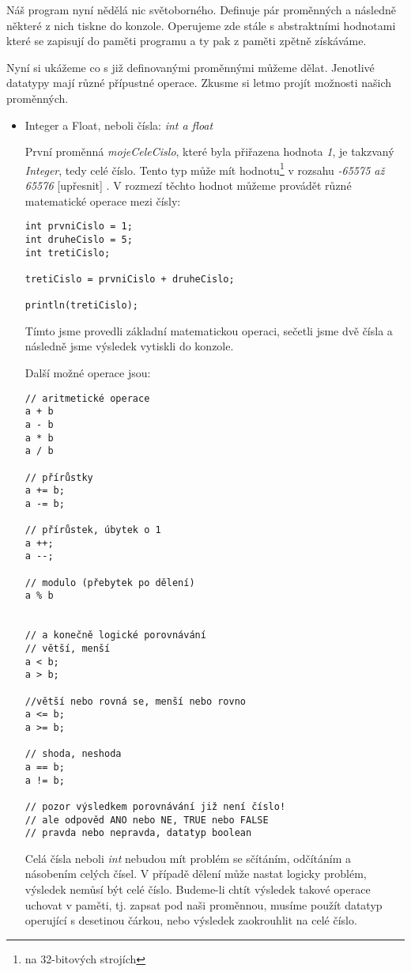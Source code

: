 \documentclass[11pt]{article} %
\begin{document}
Náš program nyní nědělá nic světoborného. Definuje pár proměnných a následně některé z nich tiskne do konzole. Operujeme zde stále s abstraktními hodnotami které se zapisují do paměti programu a ty pak z paměti zpětně získáváme.

Nyní si ukážeme co s již definovanými proměnnými můžeme dělat. Jenotlivé datatypy mají různé přípustné operace. Zkusme si letmo projít možnosti našich proměnných.

\begin{itemize}


\item{Integer a Float, neboli čísla: {\em int a float}}

První proměnná {\em mojeCeleCislo}, které byla přiřazena hodnota {\em 1}, je takzvaný {\em Integer}, tedy celé číslo. Tento typ může mít hodnotu\footnote{na 32-bitových strojích} v rozsahu {\em -65575 až 65576} [upřesnit] . V rozmezí těchto hodnot můžeme provádět různé matematické operace mezi čísly:

\begin{verbatim}
int prvniCislo = 1;
int druheCislo = 5;
int tretiCislo;

tretiCislo = prvniCislo + druheCislo;

println(tretiCislo);
\end{verbatim}

Tímto jsme provedli základní matematickou operaci, sečetli jsme dvě čísla a následně jsme výsledek vytiskli do konzole.

Další možné operace jsou:

\begin{verbatim}
// aritmetické operace
a + b
a - b
a * b
a / b

// přírůstky
a += b;
a -= b;

// přírůstek, úbytek o 1
a ++;
a --;

// modulo (přebytek po dělení)
a % b


// a konečně logické porovnávání
// větší, menší
a < b;
a > b;

//větší nebo rovná se, menší nebo rovno
a <= b;
a >= b;

// shoda, neshoda
a == b;
a != b;

// pozor výsledkem porovnávání již není číslo!
// ale odpověd ANO nebo NE, TRUE nebo FALSE
// pravda nebo nepravda, datatyp boolean

\end{verbatim}

Celá čísla neboli {\em int} nebudou mít problém se sčítáním, odčítáním a násobením celých čísel. V případě dělení může nastat logicky problém, výsledek nemůsí být celé číslo. Budeme-li chtít výsledek takové operace uchovat v paměti, tj. zapsat pod naši proměnnou, musíme použít datatyp operující s desetinou čárkou, nebo výsledek zaokrouhlit na celé číslo.


\end{itemize}
\end{document}
